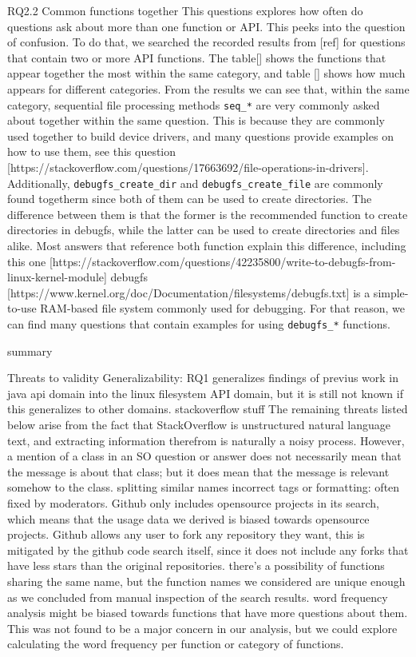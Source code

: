 RQ2.2
Common functions together
This questions explores how often do questions ask about more than one function or API. This peeks into the question of confusion. To do that, we searched the recorded results from [ref] for questions that contain two or more API functions. The table[] shows the functions that appear together the most within the same category, and table [] shows how much appears for different categories. From the results we can see that, within the same category, sequential file processing methods \texttt{seq_*} are very commonly asked about together within the same question. This is because they are commonly used together to build device drivers, and many questions provide examples on how to use them, see this question [https://stackoverflow.com/questions/17663692/file-operations-in-drivers].
Additionally, \texttt{debugfs_create_dir} and \texttt{debugfs_create_file} are commonly found togetherm since both of them can be used to create directories. The difference between them is that the former is the recommended function to create directories in debugfs, while the latter can be used to create directories and files alike. Most answers that reference both function explain this difference, including this one [https://stackoverflow.com/questions/42235800/write-to-debugfs-from-linux-kernel-module]
debugfs [https://www.kernel.org/doc/Documentation/filesystems/debugfs.txt] is a simple-to-use RAM-based file system commonly used for debugging. For that reason, we can find many questions that contain examples for using \texttt{debugfs_*} functions.


summary

Threats to validity
Generalizability:  RQ1 generalizes findings of previus work in java api domain into the linux filesystem API domain, but it is still not known if this generalizes to other domains.
stackoverflow stuff
The remaining threats listed below arise from the fact that StackOverflow is unstructured
natural language text, and extracting information therefrom is naturally a noisy
process.
However, a mention of a class in an SO question or answer does not necessarily mean
that the message is about that class; but it does mean that the message is relevant somehow
to the class.
splitting
similar names
incorrect tags or formatting: often fixed by moderators.
Github only includes opensource projects in its search, which means that the usage data we derived is biased towards opensource projects. Github allows any user to fork any repository they want, this is mitigated by the github code search itself, since it does not include any forks that have less stars than the original repositories. there's a possibility of functions sharing the same name, but the function names we considered are unique enough as we concluded from manual inspection of the search results.
word frequency analysis might be biased towards functions that have more questions about them. This was not found to be a major concern in our analysis, but we could explore calculating the word frequency per function or category of functions.

